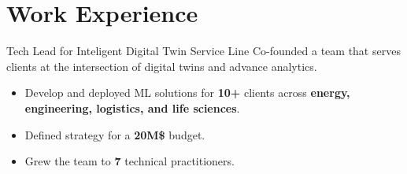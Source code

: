 \documentclass[a4paper]{deedy-resume} %
\begin{document}
\section{Work Experience}
\begin{callout}{Tech Lead for Inteligent Digital Twin Service Line}
    \linebreak
    Co-founded a team that serves clients at the intersection of digital twins and advance analytics.
    \vspace{-10pt}
    \begin{multicols}{2}
        \begin{itemize}
            \item Develop and deployed ML solutions for \textbf{10+} clients across \textbf{energy, engineering, logistics, and life sciences}. 
            \item Defined strategy for a \textbf{20M\$} budget.
            \item Grew the team to \textbf{7} technical practitioners.
        \end{itemize}
    \end{multicols}
\end{callout}
\end{document}
